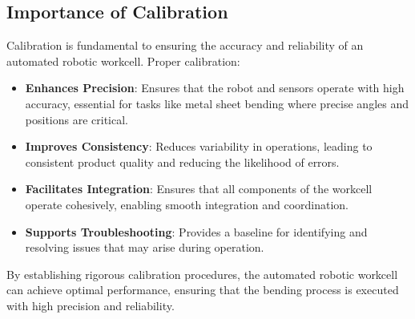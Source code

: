 \subsection{Importance of Calibration}
Calibration is fundamental to ensuring the accuracy and reliability of an automated robotic workcell. Proper calibration:

\begin{itemize}
    \item \textbf{Enhances Precision}: Ensures that the robot and sensors operate with high accuracy, essential for tasks like metal sheet bending where precise angles and positions are critical.
    \item \textbf{Improves Consistency}: Reduces variability in operations, leading to consistent product quality and reducing the likelihood of errors.
    \item \textbf{Facilitates Integration}: Ensures that all components of the workcell operate cohesively, enabling smooth integration and coordination.
    \item \textbf{Supports Troubleshooting}: Provides a baseline for identifying and resolving issues that may arise during operation.
\end{itemize}

By establishing rigorous calibration procedures, the automated robotic workcell can achieve optimal performance, ensuring that the bending process is executed with high precision and reliability.
